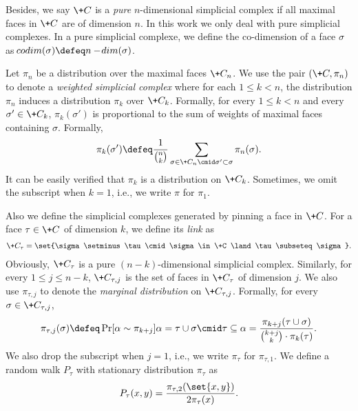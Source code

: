 Besides, we say $\+C$ is a \emph{pure} $n$-dimensional simplicial complex if all maximal faces in $\+C$ are of dimension $n$. In this work we only deal with pure simplicial complexes. In a pure simplicial complexe, we define the co-dimension of a face $\sigma$ as $\!{codim}(\sigma)\defeq n-\!{dim}(\sigma)$.

Let $\pi_n$ be a distribution over the maximal faces $\+C_n$. We use the pair $(\+C,\pi_n)$ to denote a \emph{weighted simplicial complex} where for each $1\le k < n$, the distribution $\pi_n$ induces a distribution $\pi_k$ over $\+C_k$. Formally, for every $1\le k<n$ and every $\sigma'\in \+C_k$, $\pi_k(\sigma')$ is proportional to the sum of weights of maximal faces containing $\sigma$. Formally,
\begin{align*}
    \pi_k(\sigma') \defeq \frac{1}{\binom n k}\sum_{\sigma\in \+C_n\cmid\sigma' \subset \sigma} \pi_{n}(\sigma).
\end{align*}
It can be easily verified that $\pi_k$ is a distribution on $\+C_k$. Sometimes, we omit the subscript when $k=1$, i.e., we write $\pi$ for $\pi_1$.

Also we define the simplicial complexes generated by pinning a face in $\+C$. For a face $\tau \in \+C$ of dimension $k$, we define its \emph{link} as
\begin{align*}
    \+C_\tau=\set{\sigma\setminus \tau \cmid \sigma \in \+C \land \tau \subseteq \sigma }.
\end{align*}
Obviously, $\+C_\tau$ is a pure $(n-k)$-dimensional simplicial complex. Similarly, for every $1\le j \le n-k$, $\+C_{\tau,j}$ is the set of faces in $\+C_\tau$ of dimension $j$. We also use $\pi_{\tau,j}$ to denote the \emph{marginal distribution} on $\+C_{\tau,j}$. Formally, for every $\sigma\in \+C_{\tau,j}$,
\begin{align*}
    \pi_{\tau,j}(\sigma)\defeq \Pr[\alpha \sim \pi_{k+j}]{\alpha=\tau \cup \sigma \cmid \tau\subseteq \alpha}=\frac{\pi_{k+j}(\tau \cup \sigma)}{\binom{k+j}{k} \cdot \pi_{k}(\tau)}.
\end{align*}
We also drop the subscript when $j=1$, i.e., we write $\pi_\tau$ for $\pi_{\tau,1}$. We define a random walk $P_\tau$ with stationary distribution $\pi_\tau$ as
\[
P_\tau(x,y)=\frac{\pi_{\tau,2}(\set{x,y})}{2\pi_\tau(x)}.
\]



